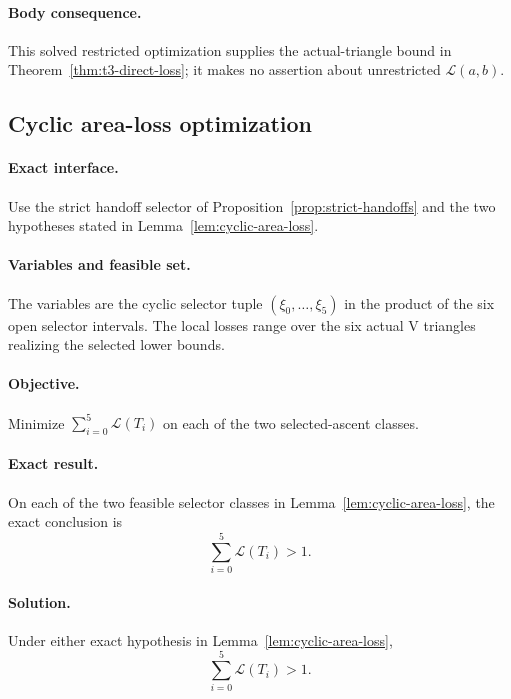 \paragraph{Body consequence.}
This solved restricted optimization supplies the actual-triangle bound in
Theorem~\ref{thm:t3-direct-loss}; it makes no assertion about unrestricted
$\mathcal L(a,b)$.

\subsection{Cyclic area-loss optimization}
\label{subsec:app-cyclic-area-optimization}

\paragraph{Exact interface.}
Use the strict handoff selector of Proposition~\ref{prop:strict-handoffs} and
the two hypotheses stated in Lemma~\ref{lem:cyclic-area-loss}.

\paragraph{Variables and feasible set.}
The variables are the cyclic selector tuple
$(\xi_0,\ldots,\xi_5)$ in the product of the six open selector intervals.
The local losses range over the six actual V triangles realizing the selected
lower bounds.

\paragraph{Objective.}
Minimize $\sum_{i=0}^5\mathcal L(T_i)$ on each of the two selected-ascent
classes.

\paragraph{Exact result.}
On each of the two feasible selector classes in
Lemma~\ref{lem:cyclic-area-loss}, the exact conclusion is
\[
 \sum_{i=0}^5\mathcal L(T_i)>1.
\]

\paragraph{Solution.}

\begin{lemma}
\label{lem:app-area-cyclic-calculation}
Under either exact hypothesis in Lemma~\ref{lem:cyclic-area-loss},
\[
 \sum_{i=0}^5\mathcal L(T_i)>1.
\]
\end{lemma}

